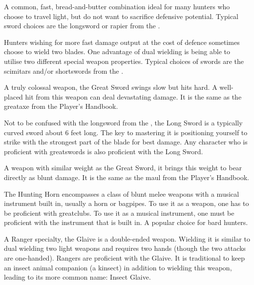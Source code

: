 A common, fast, bread-and-butter combination ideal for many hunters who choose to travel light, but do not want to sacrifice defensive potential. Typical sword choices are the longsword or rapier from the \PHB.

Hunters wishing for more fast damage output at the cost of defence sometimes choose to wield two blades. One advantage of dual wielding is being able to utilise two different special weapon properties. Typical choices of swords are the scimitars and/or shortswords from the \PHB.

A truly colossal weapon, the Great Sword swings slow but hits hard. A well-placed hit from this weapon can deal devastating damage. It is the same as the greataxe from the Player's Handbook.

Not to be confused with the longsword from the \PHB, the Long Sword is a typically curved sword about 6 feet long. The key to mastering it is positioning yourself to strike with the strongest part of the blade for best damage. Any character who is proficient with greatswords is also proficient with the Long Sword.

A weapon with similar weight as the Great Sword, it brings this weight to bear directly as blunt damage. It is the same as the maul from the Player's Handbook.

The Hunting Horn encompasses a class of blunt melee weapons with a musical instrument built in, usually a horn or bagpipes. To use it as a weapon, one has to be proficient with greatclubs. To use it as a musical instrument, one must be proficient with the instrument that is built in. A popular choice for bard hunters.

A Ranger specialty, the Glaive is a double-ended weapon. Wielding it is similar to dual wielding two light weapons and requires two hands (though the two attacks are one-handed). Rangers are proficient with the Glaive. It is traditional to keep an insect animal companion (a kinsect) in addition to wielding this weapon, leading to its more common name: Insect Glaive.

